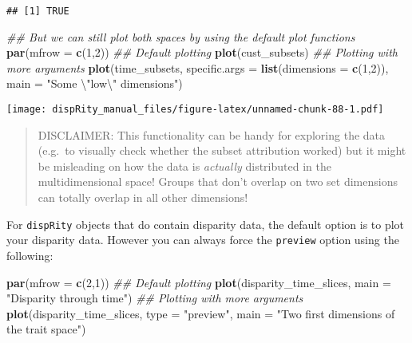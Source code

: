 \documentclass[
]{book}
\newenvironment{Shaded}{\begin{snugshade}}{\end{snugshade}}
\newcommand{\CharTok}[1]{\textcolor[rgb]{0.31,0.60,0.02}{#1}}
\newcommand{\CommentTok}[1]{\textcolor[rgb]{0.56,0.35,0.01}{\textit{#1}}}
\newcommand{\DataTypeTok}[1]{\textcolor[rgb]{0.13,0.29,0.53}{#1}}
\newcommand{\DecValTok}[1]{\textcolor[rgb]{0.00,0.00,0.81}{#1}}
\newcommand{\KeywordTok}[1]{\textcolor[rgb]{0.13,0.29,0.53}{\textbf{#1}}}
\newcommand{\NormalTok}[1]{#1}
\newcommand{\StringTok}[1]{\textcolor[rgb]{0.31,0.60,0.02}{#1}}
\begin{document}
\begin{verbatim}
## [1] TRUE
\end{verbatim}

\begin{Shaded}
\begin{Highlighting}[]
\CommentTok{\#\# But we can still plot both spaces by using the default plot functions}
\KeywordTok{par}\NormalTok{(}\DataTypeTok{mfrow =} \KeywordTok{c}\NormalTok{(}\DecValTok{1}\NormalTok{,}\DecValTok{2}\NormalTok{))}
\CommentTok{\#\# Default plotting}
\KeywordTok{plot}\NormalTok{(cust\_subsets)}
\CommentTok{\#\# Plotting with more arguments}
\KeywordTok{plot}\NormalTok{(time\_subsets, }\DataTypeTok{specific.args =} \KeywordTok{list}\NormalTok{(}\DataTypeTok{dimensions =} \KeywordTok{c}\NormalTok{(}\DecValTok{1}\NormalTok{,}\DecValTok{2}\NormalTok{)),}
     \DataTypeTok{main =} \StringTok{"Some }\CharTok{\textbackslash{}"}\StringTok{low}\CharTok{\textbackslash{}"}\StringTok{ dimensions"}\NormalTok{)}
\end{Highlighting}
\end{Shaded}

\texttt{[image: dispRity\_manual\_files/figure-latex/unnamed-chunk-88-1.pdf]}

\begin{quote}
DISCLAIMER: This functionality can be handy for exploring the data (e.g.~to visually check whether the subset attribution worked) but it might be misleading on how the data is \emph{actually} distributed in the multidimensional space!
Groups that don't overlap on two set dimensions can totally overlap in all other dimensions!
\end{quote}

For \texttt{dispRity} objects that do contain disparity data, the default option is to plot your disparity data.
However you can always force the \texttt{preview} option using the following:

\begin{Shaded}
\begin{Highlighting}[]
\KeywordTok{par}\NormalTok{(}\DataTypeTok{mfrow =} \KeywordTok{c}\NormalTok{(}\DecValTok{2}\NormalTok{,}\DecValTok{1}\NormalTok{))}
\CommentTok{\#\# Default plotting}
\KeywordTok{plot}\NormalTok{(disparity\_time\_slices, }\DataTypeTok{main =} \StringTok{"Disparity through time"}\NormalTok{)}
\CommentTok{\#\# Plotting with more arguments}
\KeywordTok{plot}\NormalTok{(disparity\_time\_slices, }\DataTypeTok{type =} \StringTok{"preview"}\NormalTok{,}
     \DataTypeTok{main =} \StringTok{"Two first dimensions of the trait space"}\NormalTok{)}
\end{Highlighting}
\end{Shaded}
\end{document}
